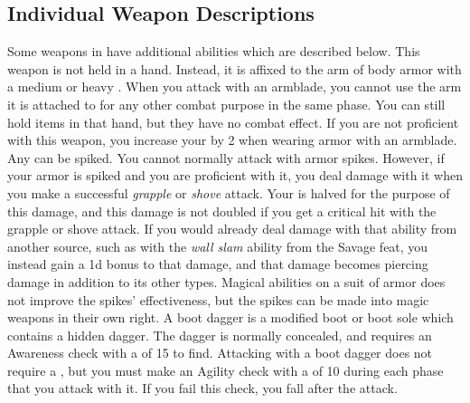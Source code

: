     \subsection{Individual Weapon Descriptions}
        Some weapons in  have additional abilities which are described below.
         This weapon is not held in a hand.
        Instead, it is affixed to the arm of body armor with a medium or heavy .
        When you attack with an armblade, you cannot use the arm it is attached to for any other combat purpose in the same phase.
        You can still hold items in that hand, but they have no combat effect.
        If you are not proficient with this weapon, you increase your  by 2 when wearing armor with an armblade.
         Any  can be spiked.
        You cannot normally attack with armor spikes.
        However, if your armor is spiked and you are proficient with it, you deal damage with it when you make a successful \textit{grapple} or \textit{shove} attack.
        Your  is halved for the purpose of this damage, and this damage is not doubled if you get a critical hit with the grapple or shove attack.
        If you would already deal damage with that ability from another source, such as with the \textit{wall slam} ability from the Savage feat, you instead gain a \plus1d bonus to that damage, and that damage becomes piercing damage in addition to its other types.
        Magical abilities on a suit of armor does not improve the spikes' effectiveness, but the spikes can be made into magic weapons in their own right.
         A boot dagger is a modified boot or boot sole which contains a hidden dagger.
        The dagger is normally concealed, and requires an Awareness check with a  of 15 to find.
        Attacking with a boot dagger does not require a , but you must make an Agility check with a  of 10 during each phase that you attack with it.
        If you fail this check, you fall \prone after the attack.

